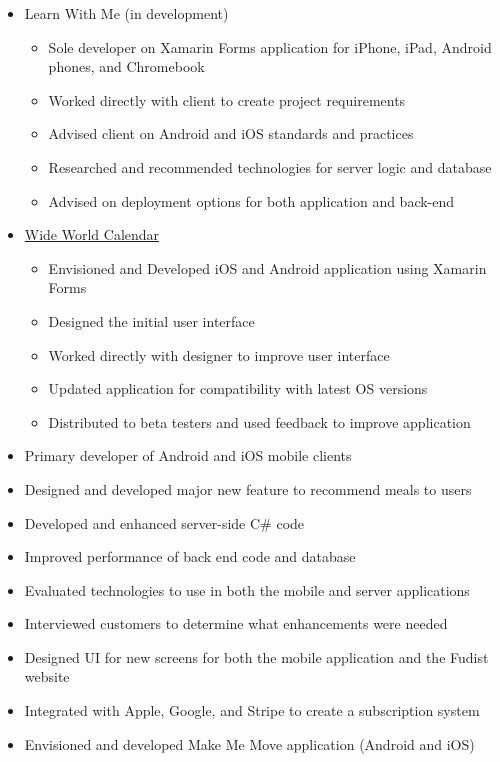 \documentclass[12pt,letterpaper,sans]{moderncv}
\begin{document}
	\begin{itemize}[leftmargin=1.24in]
		\item Learn With Me (in development)
			\begin{itemize}
				\item Sole developer on Xamarin Forms application for iPhone, iPad, Android phones, and Chromebook
				\item Worked directly with client to create project requirements
				\item Advised client on Android and iOS standards and practices
				\item Researched and recommended technologies for server logic and database
				\item Advised on deployment options for both application and back-end
			\end{itemize}
		\item \href{https://github.com/HofmaDresu/WideWorldCalendar}{Wide World Calendar}
			\begin{itemize}
				\item Envisioned and Developed iOS and Android application using Xamarin Forms
				\item Designed the initial user interface
				\item Worked directly with designer to improve user interface
				\item Updated application for compatibility with latest OS versions
				\item Distributed to beta testers and used feedback to improve application
			\end{itemize} 
	\end{itemize}
	\begin{itemize}[leftmargin=1.24in]
		\item Primary developer of Android and iOS mobile clients
		\item Designed and developed major new feature to recommend meals to users
		\item Developed and enhanced server-side C\# code
		\item Improved performance of back end code and database
		\item Evaluated technologies to use in both the mobile and server applications
		\item Interviewed customers to determine what enhancements were needed
		\item Designed UI for new screens for both the mobile application and the Fudist website
		\item Integrated with Apple, Google, and Stripe to create a subscription system	
		\item Envisioned and developed Make Me Move application (Android and iOS)
	\end{itemize}
\end{document}
